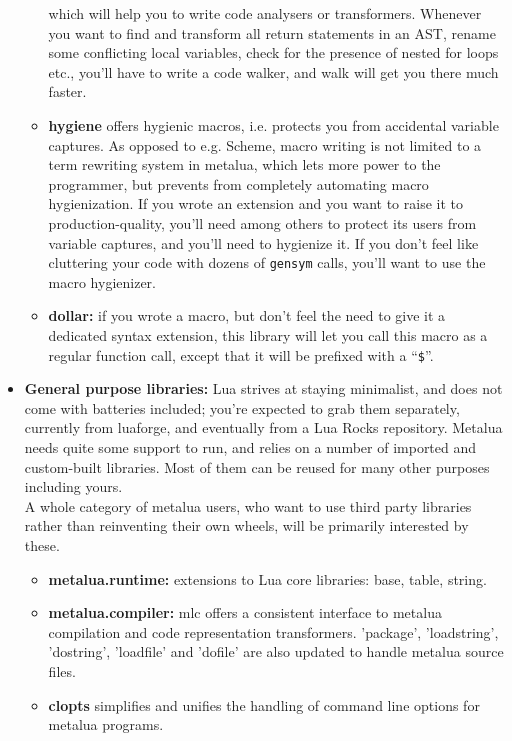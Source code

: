 \begin{itemize}
\begin{itemize}
    which will help you to write code analysers or transformers. Whenever you
    want to find and transform all return statements in an AST, rename some
    conflicting local variables, check for the presence of nested for loops
    etc., you'll have to write a code walker, and walk will get you there much
    faster. 
  \item{\bf hygiene} offers hygienic macros, i.e. protects you from accidental
    variable captures. As opposed to e.g. Scheme, macro writing is not limited
    to a term rewriting system in metalua, which lets more power to the
    programmer, but prevents from completely automating macro hygienization. If
    you wrote an extension and you want to raise it to production-quality,
    you'll need among others to protect its users from variable captures, and
    you'll need to hygienize it. If you don't feel like cluttering your code
    with dozens of {\tt gensym} calls, you'll want to use the macro hygienizer.
  \item{\bf dollar:} if you wrote a macro, but don't feel the need to give it a
    dedicated syntax extension, this library will let you call this macro as a
    regular function call, except that it will be prefixed with a ``{\tt\$}''.
  \end{itemize}
  \item{\bf General purpose libraries:} Lua strives at staying minimalist, and does
    not come with batteries included; you're expected to grab them separately,
    currently from luaforge, and eventually from a Lua Rocks repository. Metalua
    needs quite some support to run, and relies on a number of imported and
    custom-built libraries. Most of them can be reused for many other purposes
    including yours.\\
    A whole category of metalua users, who want to use third party libraries
    rather than reinventing their own wheels, will be primarily interested by
    these.
    \begin{itemize}
    \item{\bf metalua.runtime:} extensions to Lua core libraries: base, table,
      string.
    \item{\bf metalua.compiler:} mlc offers a consistent interface to metalua
      compilation and code representation transformers. 'package', 'loadstring',
      'dostring', 'loadfile' and 'dofile' are also updated to handle metalua
      source files.
    \item{\bf clopts} simplifies and unifies the handling of command line options
      for metalua programs.

\end{itemize}
\end{itemize}

